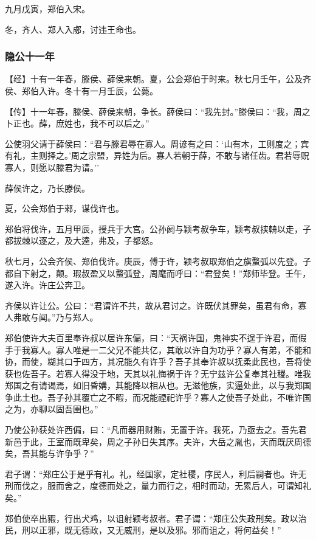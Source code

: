 \documentclass[]{article}
\begin{document}
九月戊寅，郑伯入宋。

冬，齐人、郑人入郕，讨违王命也。

\hypertarget{header-n139}{%
\subsubsection{隐公十一年}\label{header-n139}}

【经】十有一年春，滕侯、薛侯来朝。夏，公会郑伯于时来。秋七月壬午，公及齐侯、郑伯入许。冬十有一月壬辰，公薨。

【传】十一年春，滕侯、薛侯来朝，争长。薛侯曰：``我先封。''滕侯曰：``我，周之卜正也。薛，庶姓也，我不可以后之。''

公使羽父请于薛侯曰：``君与滕君辱在寡人。周谚有之曰：`山有木，工则度之；宾有礼，主则择之。'周之宗盟，异姓为后。寡人若朝于薛，不敢与诸任齿。君若辱贶寡人，则愿以滕君为请。''

薛侯许之，乃长滕侯。

夏，公会郑伯于郲，谋伐许也。

郑伯将伐许，五月甲辰，授兵于大宫。公孙阏与颖考叔争车，颖考叔挟輈以走，子都拔棘以逐之，及大逵，弗及，子都怒。

秋七月，公会齐侯、郑伯伐许。庚辰，傅于许，颖考叔取郑伯之旗蝥弧以先登。子都自下射之，颠。瑕叔盈又以蝥弧登，周麾而呼曰：``君登矣！''郑师毕登。壬午，遂入许。许庄公奔卫。

齐侯以许让公。公曰：``君谓许不共，故从君讨之。许既伏其罪矣，虽君有命，寡人弗敢与闻。''乃与郑人。

郑伯使许大夫百里奉许叔以居许东偏，曰：``天祸许国，鬼神实不逞于许君，而假手于我寡人。寡人唯是一二父兄不能共亿，其敢以许自为功乎？寡人有弟，不能和协，而使，糊其口于四方，其况能久有许乎？吾子其奉许叔以抚柔此民也，吾将使获也佐吾子。若寡人得没于地，天其以礼悔祸于许？无宁兹许公复奉其社稷。唯我郑国之有请谒焉，如旧昏媾，其能降以相从也。无滋他族，实逼处此，以与我郑国争此土也。吾子孙其覆亡之不暇，而况能禋祀许乎？寡人之使吾子处此，不唯许国之为，亦聊以固吾圉也。''

乃使公孙获处许西偏，曰：``凡而器用财贿，无置于许。我死，乃亟去之。吾先君新邑于此，王室而既卑矣，周之子孙日失其序。夫许，大岳之胤也，天而既厌周德矣，吾其能与许争乎？''

君子谓：``郑庄公于是乎有礼。礼，经国家，定社稷，序民人，利后嗣者也。许无刑而伐之，服而舍之，度德而处之，量力而行之，相时而动，无累后人，可谓知礼矣。''

郑伯使卒出豭，行出犬鸡，以诅射颖考叔者。君子谓：``郑庄公失政刑矣。政以治民，刑以正邪，既无德政，又无威刑，是以及邪。邪而诅之，将何益矣！''
\end{document}
